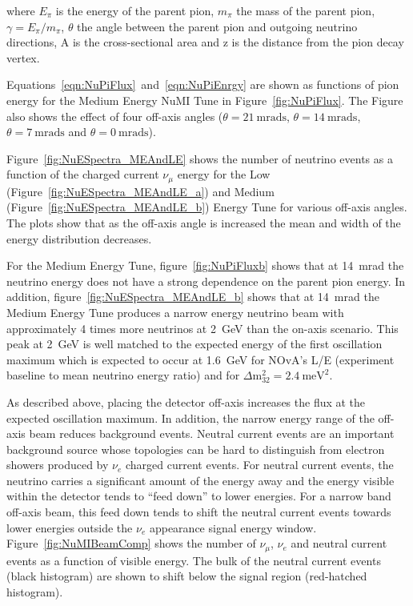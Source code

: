 \noindent where $E_{\pi}$ is the energy of the parent pion, $m_{\pi}$
the mass of the parent pion, $\gamma = E_{\pi}/m_{\pi}$, $\theta$ the
angle between the parent pion and outgoing
neutrino directions, A is the cross-sectional area and z is the distance
from the pion decay vertex.


Equations~\ref{eqn:NuPiFlux}~and~\ref{eqn:NuPiEnrgy} are shown as 
functions of pion energy for the Medium Energy NuMI Tune in
Figure~\ref{fig:NuPiFlux}. The Figure also shows the effect of four
off-axis angles ($\theta = 21~\text{mrads}$, $\theta =
14~\text{mrads}$, $\theta = 7~\text{mrads}$ and $\theta =
0~\text{mrads}$). 


Figure~\ref{fig:NuESpectra_MEAndLE} shows the number of neutrino
events as a function of the
charged current $\nu_{\mu}$ energy for the Low
(Figure~\ref{fig:NuESpectra_MEAndLE_a}) and 
Medium (Figure~\ref{fig:NuESpectra_MEAndLE_b}) Energy Tune for various
off-axis angles. The plots show that as the off-axis angle is
increased the mean and width of the energy distribution decreases.


For the Medium Energy Tune, figure~\ref{fig:NuPiFluxb} shows that at
14~mrad the neutrino energy
does not have a strong dependence on the parent pion energy.
In addition, figure~\ref{fig:NuESpectra_MEAndLE_b} shows that at
14~mrad the Medium
Energy Tune produces a narrow energy neutrino beam with approximately
4 times more neutrinos at 2~GeV than the on-axis scenario. This peak at
2~GeV is well matched to the expected energy of the first oscillation
maximum which is expected to occur at 1.6~GeV for
NOvA's L/E (experiment baseline to mean neutrino energy ratio) and for
$\Delta \textrm{m}_{32}^2=2.4~\textrm{meV}^2$. 

As described above, placing the detector off-axis increases the flux
at the expected oscillation maximum. In addition, the narrow energy
range of the off-axis beam reduces background
events. Neutral current events are an important background source
whose topologies can be hard to distinguish from electron showers
produced by $\nu_e$ charged current events. For neutral current events, the neutrino carries a
significant amount of the energy away and the energy visible within
the detector tends to
``feed down'' to lower energies. For a narrow band off-axis beam, this
feed down tends to shift the neutral current events towards lower energies
outside the $\nu_e$ appearance signal energy
window. Figure~\ref{fig:NuMIBeamComp} 
shows the number of $\nu_{\mu}$, $\nu_e$ and neutral current events as a function
of visible energy. The bulk of the neutral current events (black histogram) are
shown to shift below the signal region (red-hatched histogram).

